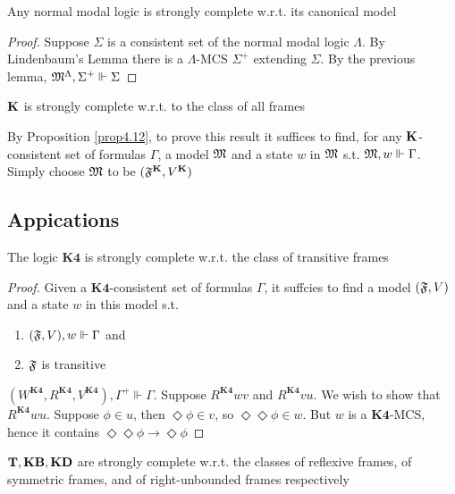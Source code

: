 \documentclass[11pt]{article}
\newcommand{\KB}{\textbf{KB}}
\newcommand{\KD}{\textbf{KD}}
\newcommand{\KF}{\textbf{K4}}
\begin{document}
\begin{theorem}
Any normal modal logic is strongly complete w.r.t. its canonical model
\end{theorem}

\begin{proof}
Suppose \(\Sigma\) is a consistent set of the normal modal logic \(\Lambda\). By Lindenbaum's
Lemma there is a \(\Lambda\)-MCS \(\Sigma^+\) extending \(\Sigma\). By the previous lemma,
\(\mathfrak{M}^\Lambda,\Sigma^+\Vdash\Sigma\)
\end{proof}

\begin{theorem}[]
\(\operatorname{\textbf{K}}\) is strongly complete w.r.t. to the class of all frames
\end{theorem}

\begin{proposition}[]
By Proposition \ref{prop4.12}, to prove this result it suffices to find, for
any \(\operatorname{\textbf{K}}\)-consistent set of formulas \(\Gamma\), a model \(\mathfrak{M}\) and a state \(w\)
in \(\mathfrak{M}\) s.t. \(\mathfrak{M},w\Vdash\Gamma\). Simply choose \(\mathfrak{M}\) to be \((\mathfrak{F}^{\operatorname{\textbf{K}}},V^{\operatorname{\textbf{K}}})\)
\end{proposition}


\subsection{Appications}
\label{sec:org66ab97d}
\begin{theorem}[]
The logic \(\textbf{K4}\) is strongly complete w.r.t. the class of transitive frames
\end{theorem}

\begin{proof}
Given a \(\KF\)-consistent set of formulas \(\Gamma\), it suffcies to find a model
\((\mathfrak{F},V)\) and a state \(w\) in this model s.t.
\begin{enumerate}
\item \((\mathfrak{F},V),w\Vdash\Gamma\) and
\item \(\mathfrak{F}\) is transitive
\end{enumerate}


\((W^{\KF},R^{\KF},V^{\KF}),\Gamma^+\Vdash\Gamma\). Suppose \(R^{\KF}wv\) and
\(R^{\KF}vu\). We wish to show that \(R^{\KF}wu\). Suppose \(\phi\in u\),
then \(\Diamond\phi\in v\), so \(\Diamond\Diamond\phi\in w\). But \(w\) is a
\(\KF\)-MCS, hence it contains \(\Diamond\Diamond\phi\to\Diamond\phi\)
\end{proof}

\begin{theorem}[]
\(\bT,\KB,\KD\) are strongly complete w.r.t. the classes of reflexive frames,
of symmetric frames, and of right-unbounded frames respectively
\end{theorem}
\end{document}
